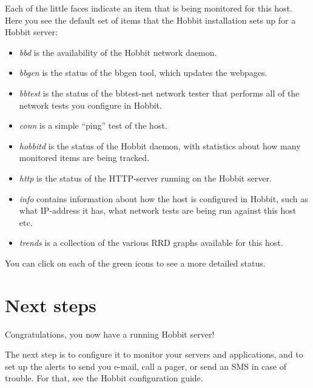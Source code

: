  Each of the little faces indicate an item that is being monitored for this host. Here you see the default set of items that the Hobbit installation sets up for a Hobbit server:
\begin{itemize}
\item \emph{bbd}
 is the availability of the Hobbit network daemon.
\item \emph{bbgen}
 is the status of the bbgen tool, which updates the webpages.
\item \emph{bbtest}
 is the status of the bbtest-net network tester that performs all of the network tests you configure in Hobbit.
\item \emph{conn}
 is a simple ``ping'' test of the host.
\item \emph{hobbitd}
 is the status of the Hobbit daemon, with statistics about how many monitored items are being tracked.
\item \emph{http}
 is the status of the HTTP-server running on the Hobbit server.
\item \emph{info}
 contains information about how the host is configured in Hobbit, such as what IP-address it has, what network tests are being run against this host etc.
\item \emph{trends}
 is a collection of the various RRD graphs available for this host.

\end{itemize}


 You can click on each of the green icons to see a more detailed status.
\section{Next steps}


 Congratulations, you now have a running Hobbit server!


 The next step is to configure it to monitor your servers and applications, and to set up the alerts to send you e-mail, call a pager, or send an SMS in case of trouble. For that, see the Hobbit configuration guide.


